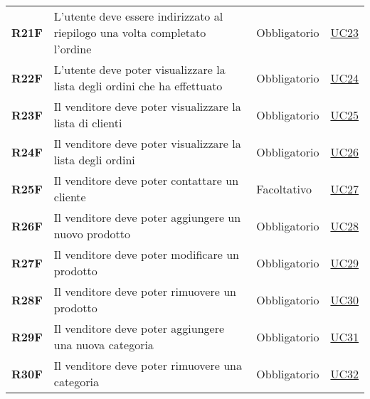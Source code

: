 \begin{center}
\begin{longtable}[!h]{p{50px} p{245px} p{75px} p{50px}}
        \textbf{R21F}                         & L'utente deve essere indirizzato al riepilogo una volta completato l'ordine                         & Obbligatorio             & \hyperref[sec:UC23]{UC23}                      \\
        \textbf{R22F}                         & L'utente deve poter visualizzare la lista degli ordini che ha effettuato                            & Obbligatorio             & \hyperref[sec:UC24]{UC24}                      \\
        \textbf{R23F}                         & Il venditore deve poter visualizzare la lista di clienti                                            & Obbligatorio             & \hyperref[sec:UC25]{UC25}                      \\
        \textbf{R24F}                         & Il venditore deve poter visualizzare la lista degli ordini                                          & Obbligatorio             & \hyperref[sec:UC26]{UC26}                      \\
        \textbf{R25F}                         & Il venditore deve poter contattare un cliente                                                       & Facoltativo              & \hyperref[sec:UC27]{UC27}                      \\
        \textbf{R26F}                         & Il venditore deve poter aggiungere un nuovo prodotto                                                & Obbligatorio             & \hyperref[sec:UC28]{UC28}                      \\
        \textbf{R27F}                         & Il venditore deve poter modificare un prodotto                                                      & Obbligatorio             & \hyperref[sec:UC29]{UC29}                      \\
        \textbf{R28F}                         & Il venditore deve poter rimuovere un prodotto                                                       & Obbligatorio             & \hyperref[sec:UC30]{UC30}                      \\
        \textbf{R29F}                         & Il venditore deve poter aggiungere una nuova categoria                                              & Obbligatorio             & \hyperref[sec:UC31]{UC31}                      \\
        \textbf{R30F}                         & Il venditore deve poter rimuovere una categoria                                                     & Obbligatorio             & \hyperref[sec:UC32]{UC32}                      \\

\end{longtable}
\end{center}
